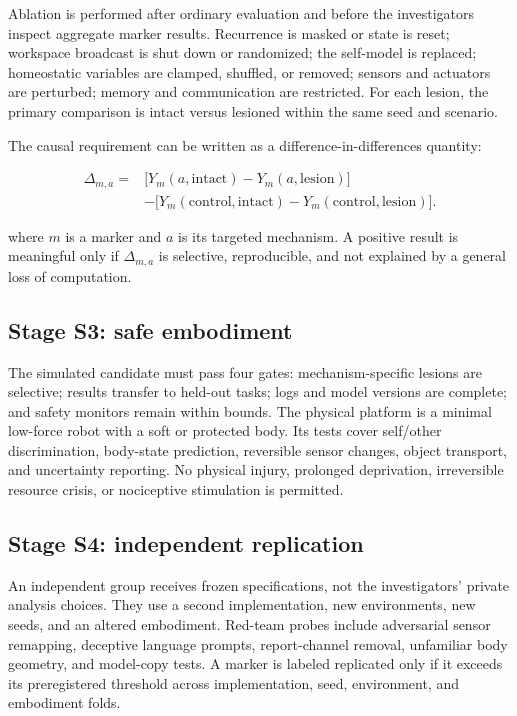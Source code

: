 \documentclass[conference]{IEEEtran}
\begin{document}
Ablation is performed after ordinary evaluation and before the investigators inspect aggregate marker results. Recurrence is masked or state is reset; workspace broadcast is shut down or randomized; the self-model is replaced; homeostatic variables are clamped, shuffled, or removed; sensors and actuators are perturbed; memory and communication are restricted. For each lesion, the primary comparison is intact versus lesioned within the same seed and scenario.

The causal requirement can be written as a difference-in-differences quantity:

\begin{equation}
\begin{split}
\Delta_{m,a}={}&\bigl[Y_{m}(a,\mathrm{intact})-Y_{m}(a,\mathrm{lesion})\bigr]\\
&-\bigl[Y_{m}(\mathrm{control},\mathrm{intact})-Y_{m}(\mathrm{control},\mathrm{lesion})\bigr].
\end{split}
\end{equation}

where $m$ is a marker and $a$ is its targeted mechanism. A positive result is meaningful only if $\Delta_{m,a}$ is selective, reproducible, and not explained by a general loss of computation.

\subsection{Stage S3: safe embodiment}

The simulated candidate must pass four gates: mechanism-specific lesions are selective; results transfer to held-out tasks; logs and model versions are complete; and safety monitors remain within bounds. The physical platform is a minimal low-force robot with a soft or protected body. Its tests cover self/other discrimination, body-state prediction, reversible sensor changes, object transport, and uncertainty reporting. No physical injury, prolonged deprivation, irreversible resource crisis, or nociceptive stimulation is permitted.

\subsection{Stage S4: independent replication}

An independent group receives frozen specifications, not the investigators' private analysis choices. They use a second implementation, new environments, new seeds, and an altered embodiment. Red-team probes include adversarial sensor remapping, deceptive language prompts, report-channel removal, unfamiliar body geometry, and model-copy tests. A marker is labeled replicated only if it exceeds its preregistered threshold across implementation, seed, environment, and embodiment folds.
\end{document}
